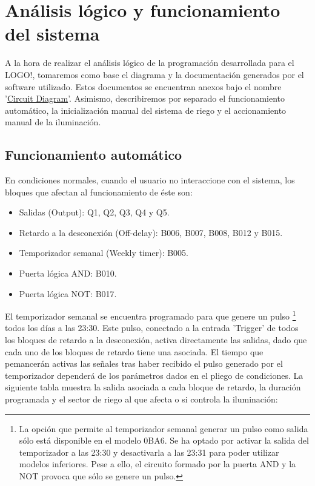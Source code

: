 \section{An\'alisis l\'ogico y funcionamiento del sistema}

A la hora de realizar el an\'alisis l\'ogico de la programaci\'on desarrollada para el LOGO!, tomaremos como base el diagrama y la documentaci\'on generados por el software utilizado. Estos documentos se encuentran anexos bajo el nombre '\hyperref[CircuitDiagram]{Circuit Diagram}'. Asimismo, describiremos por separado el funcionamiento autom\'atico, la inicializaci\'on manual del sistema de riego y el accionamiento manual de la iluminaci\'on.

\subsection{Funcionamiento autom\'atico}

En condiciones normales, cuando el usuario no interaccione con el sistema, los bloques que afectan al funcionamiento de \'este son:

\begin{itemize}
 \item Salidas (Output): Q1, Q2, Q3, Q4 y Q5.
 \item Retardo a la desconexi\'on (Off-delay): B006, B007, B008, B012 y B015.
 \item Temporizador semanal (Weekly timer): B005.
 \item Puerta l\'ogica AND: B010.
 \item Puerta l\'ogica NOT: B017.
\end{itemize}

El temporizador semanal se encuentra programado para que genere un pulso \footnote{\tiny{La opci\'on que permite al temporizador semanal generar un pulso como salida s\'olo est\'a disponible en el modelo 0BA6. Se ha optado por activar la salida del temporizador a las 23:30 y desactivarla a las 23:31 para poder utilizar modelos inferiores. Pese a ello, el circuito formado por la puerta AND y la NOT provoca que s\'olo se genere un pulso.}} todos los d\'ias a las 23:30. Este pulso, conectado a la entrada 'Trigger' de todos los bloques de retardo a la desconexi\'on, activa directamente las salidas, dado que cada uno de los bloques de retardo tiene una asociada. El tiempo que pemancer\'an activas las señales tras haber recibido el pulso generado por el temporizador depender\'a de los par\'ametros dados en el pliego de condiciones. La siguiente tabla muestra la salida asociada a cada bloque de retardo, la duraci\'on programada y el sector de riego al que afecta o si controla la iluminaci\'on:

